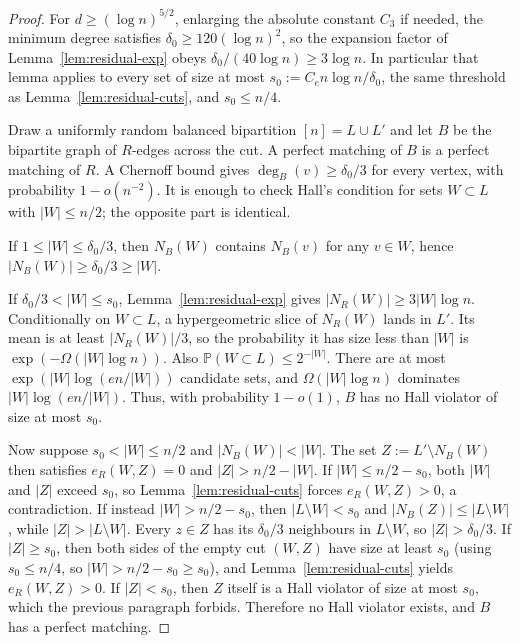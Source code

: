 \documentclass[11pt]{article}
\newcommand{\PP}{\mathbb{P}}
\begin{document}
\begin{proof}
For \(d\ge(\log n)^{5/2}\), enlarging the absolute constant \(C_3\) if needed,
the minimum degree satisfies \(\delta_0\ge 120(\log n)^2\),
so the expansion factor of Lemma~\ref{lem:residual-exp} obeys
\(\delta_0/(40\log n)\ge 3\log n\).
In particular that lemma applies to every set of size at most
\(s_0:=C_e n\log n/\delta_0\), the same threshold as Lemma~\ref{lem:residual-cuts},
and \(s_0\le n/4\).

Draw a uniformly random balanced bipartition \([n]=L\cup L'\) and let \(B\) be the
bipartite graph of \(R\)-edges across the cut.
A perfect matching of \(B\) is a perfect matching of \(R\).
A Chernoff bound gives \(\deg_B(v)\ge\delta_0/3\) for every vertex, with probability
\(1-o(n^{-2})\).
It is enough to check Hall's condition for sets \(W\subset L\) with \(|W|\le n/2\);
the opposite part is identical.

If \(1\le|W|\le\delta_0/3\), then \(N_B(W)\) contains \(N_B(v)\) for any \(v\in W\), hence
\(|N_B(W)|\ge\delta_0/3\ge|W|\).

If \(\delta_0/3<|W|\le s_0\), Lemma~\ref{lem:residual-exp} gives
\(|N_R(W)|\ge 3|W|\log n\).
Conditionally on \(W\subset L\), a hypergeometric slice of \(N_R(W)\) lands in \(L'\).
Its mean is at least \(|N_R(W)|/3\), so the probability it has size less than
\(|W|\) is \(\exp(-\Omega(|W|\log n))\).
Also \(\PP(W\subset L)\le 2^{-|W|}\).
There are at most \(\exp(|W|\log(en/|W|))\) candidate sets, and
\(\Omega(|W|\log n)\) dominates \(|W|\log(en/|W|)\).
Thus, with probability \(1-o(1)\), \(B\) has no Hall violator of size at most \(s_0\).

Now suppose \(s_0<|W|\le n/2\) and \(|N_B(W)|<|W|\).
The set \(Z:=L'\setminus N_B(W)\) then satisfies \(e_R(W,Z)=0\) and
\(|Z|>n/2-|W|\).
If \(|W|\le n/2-s_0\), both \(|W|\) and \(|Z|\) exceed \(s_0\), so
Lemma~\ref{lem:residual-cuts} forces \(e_R(W,Z)>0\), a contradiction.
If instead \(|W|>n/2-s_0\), then \(|L\setminus W|<s_0\) and
\(|N_B(Z)|\le|L\setminus W|\), while \(|Z|>|L\setminus W|\).
Every \(z\in Z\) has its \(\delta_0/3\) neighbours in \(L\setminus W\), so
\(|Z|>\delta_0/3\).
If \(|Z|\ge s_0\), then both sides of the empty cut \((W,Z)\) have size at least
\(s_0\) (using \(s_0\le n/4\), so \(|W|>n/2-s_0\ge s_0\)), and
Lemma~\ref{lem:residual-cuts} yields \(e_R(W,Z)>0\).
If \(|Z|<s_0\), then \(Z\) itself is a Hall violator of size at most \(s_0\), which
the previous paragraph forbids.
Therefore no Hall violator exists, and \(B\) has a perfect matching.
\end{proof}
\end{document}
